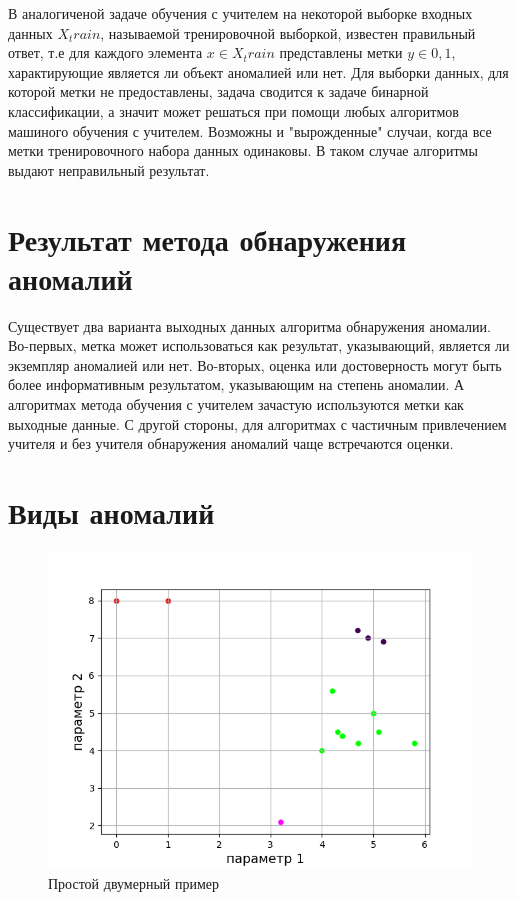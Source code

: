 В аналогиченой задаче обучения с учителем на некоторой выборке входных данных $X_train$, называемой тренировочной выборкой, известен правильный ответ, т.е для каждого элемента $x \in X_train$ представлены метки $ y \in {0,1} $, характирующие является ли объект аномалией или нет. Для выборки данных, для которой метки не предоставлены, задача сводится к задаче бинарной классификации, а значит может решаться при помощи любых алгоритмов  машиного обучения с учителем. Возможны и "вырожденные" случаи, когда все метки тренировочного набора данных одинаковы. В таком случае алгоритмы выдают неправильный результат.

\section{Результат метода обнаружения аномалий}
Существует два варианта выходных данных алгоритма обнаружения аномалии. Во-первых, метка может использоваться как результат, указывающий, является ли экземпляр аномалией или нет. Во-вторых, оценка или достоверность могут быть более информативным результатом, указывающим на степень аномалии. А алгоритмах метода обучения с учителем зачастую используются метки как выходные данные. С другой стороны, для алгоритмах  с частичным привлечением учителя и без учителя  обнаружения аномалий чаще встречаются оценки.
\section{Виды аномалий}
\begin{figure}
	\centering
	\includegraphics[width=.5\textwidth]{img/1.png}
	\caption{Простой двумерный пример}
	\label{fig01}
\end{figure}

